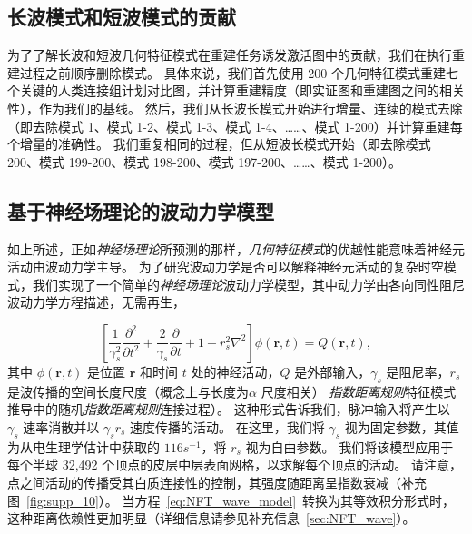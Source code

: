 \documentclass[lang=cn,a4paper,newtx,citestyle=gb7714-2015, bibstyle=gb7714-2015]{elegantpaper}
\begin{document}
\subsection{长波模式和短波模式的贡献} \label{sec:wavelength_contributions}

为了了解长波和短波几何特征模式在重建任务诱发激活图中的贡献，我们在执行重建过程之前顺序删除模式。
具体来说，我们首先使用 200 个几何特征模式重建七个关键的人类连接组计划对比图，并计算重建精度（即实证图和重建图之间的相关性），作为我们的基线。
然后，我们从长波长模式开始进行增量、连续的模式去除（即去除模式 1、模式 1-2、模式 1-3、模式 1-4、……、模式 1-200）并计算重建每个增量的准确性。
我们重复相同的过程，但从短波长模式开始（即去除模式 200、模式 199-200、模式 198-200、模式 197-200、……、模式 1-200）。


\subsection{基于神经场理论的波动力学模型} \label{sec:NFT_model}

如上所述，正如\textit{神经场理论}所预测的那样，\textit{几何特征模式}的优越性能意味着神经元活动由波动力学主导。
为了研究波动力学是否可以解释神经元活动的复杂时空模式，我们实现了一个简单的\textit{神经场理论}波动力学模型，其中动力学由各向同性阻尼波动力学方程描述，无需再生\cite{jirsa1996field,robinson1997propagation}，

\begin{equation}\label{eq:NFT_wave_model}
	[\frac{1}{\gamma_s^2} \frac{\partial ^2}{\partial t^2} + 
	\frac{2}{\gamma_s} \frac{\partial}{\partial t} + 1 - r_s^2 \nabla^2] 
	\phi(\textbf{r}, t) = Q(\textbf{r}, t),
\end{equation}
%
其中 $ \phi(\boldsymbol{r}, t) $ 是位置 $ \textbf{r} $ 和时间 $ t $ 处的神经活动，$ Q $ 是外部输入，$ \gamma_s $ 是阻尼率，$ r_s $ 是波传播的空间长度尺度（概念上与长度为$ \alpha $ 尺度相关） \textit{指数距离规则}特征模式推导中的随机\textit{指数距离规则}连接过程）。
这种形式告诉我们，脉冲输入将产生以 $ \gamma_s $ 速率消散并以 $ \gamma_s r_s $ 速度传播的活动。
在这里，我们将 $ \gamma_s $ 视为固定参数，其值为从电生理学估计中获取的 $ 116 s^{-1} $\cite{robinson2005multiscale}，将 $ r_s $ 视为自由参数。
我们将该模型应用于每个半球 32,492 个顶点的皮层中层表面网格，以求解每个顶点的活动。
请注意，点之间活动的传播受其白质连接性的控制，其强度随距离呈指数衰减（补充图~\ref{fig:supp_10}）。
当方程~\ref{eq:NFT_wave_model}~转换为其等效积分形式时，这种距离依赖性更加明显（详细信息请参见补充信息~\ref{sec:NFT_wave}）。
\end{document}
